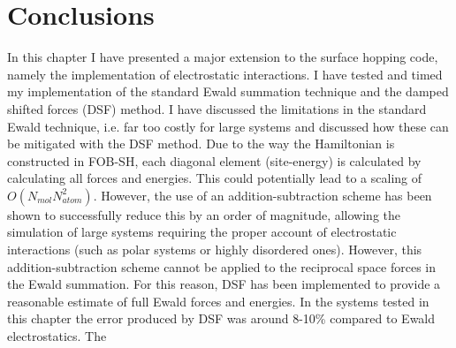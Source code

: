 
\section{Conclusions}
In this chapter I have presented a major extension to the surface hopping code, namely the implementation of electrostatic interactions. I have tested and timed my implementation of the standard Ewald summation technique and the damped shifted forces (DSF) method. I have discussed the limitations in the standard Ewald technique, i.e. far too costly for large systems and discussed how these can be mitigated with the DSF method. Due to the way the Hamiltonian is constructed in FOB-SH, each diagonal element (site-energy) is calculated by calculating all forces and energies. This could potentially lead to a scaling of $O(N_{mol} N_{atom}^2)$. However, the use of an addition-subtraction scheme has been shown to successfully reduce this by an order of magnitude, allowing the simulation of large systems requiring the proper account of electrostatic interactions (such as polar systems or highly disordered ones). However, this addition-subtraction scheme cannot be applied to the reciprocal space forces in the Ewald summation. For this reason, DSF has been implemented to provide a reasonable estimate of full Ewald forces and energies. In the systems tested in this chapter the error produced by DSF was around 8-10\% compared to Ewald electrostatics. The 
